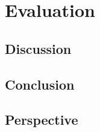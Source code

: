 	\chapter{Evaluation}
		\section{Discussion}
		\section{Conclusion}
		\section{Perspective}
	
	\cleardoublepage
{}
\label{chap:bib}

\listoffigures
\lstlistoflistings

\appendix	

